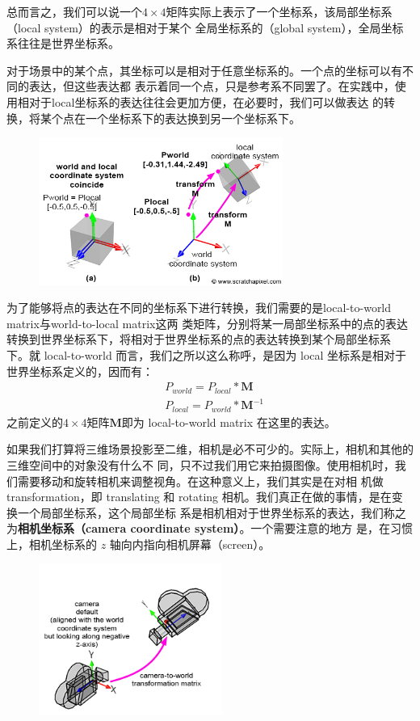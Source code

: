 \documentclass[12pt]{article}
\begin{document}
\indent{}总而言之，我们可以说一个$4\times 4$矩阵实际上表示了一个坐标系，该局部坐标系（local system）的表示是相对于某个
全局坐标系的（global system），全局坐标系往往是世界坐标系。

\indent{}对于场景中的某个点，其坐标可以是相对于任意坐标系的。一个点的坐标可以有不同的表达，但这些表达都
表示着同一个点，只是参考系不同罢了。在实践中，使用相对于local坐标系的表达往往会更加方便，在必要时，我们可以做表达
的转换，将某个点在一个坐标系下的表达换到另一个坐标系下。

\begin{figure}[h]
\centering
\includegraphics[width=8cm]{./imgs/coordsys2.png}
\end{figure}

\indent{}为了能够将点的表达在不同的坐标系下进行转换，我们需要的是local-to-world matrix与world-to-local matrix这两
类矩阵，分别将某一局部坐标系中的点的表达转换到世界坐标系下，将相对于世界坐标系的点的表达转换到某个局部坐标系
下。就 local-to-world 而言，我们之所以这么称呼，是因为 local 坐标系是相对于世界坐标系定义的，因而有：
\begin{align*}
&P_{world} = P_{local} * \mathbf{M}\\
&P_{local} = P_{world} * \mathbf{M}^{-1}
\end{align*}
\noindent{}之前定义的$4\times 4$矩阵$\mathbf{M}$即为 local-to-world matrix 在这里的表达。

\indent{}如果我们打算将三维场景投影至二维，相机是必不可少的。实际上，相机和其他的三维空间中的对象没有什么不
同，只不过我们用它来拍摄图像。使用相机时，我们需要移动和旋转相机来调整视角。在这种意义上，我们其实是在对相
机做transformation，即 translating 和 rotating 相机。我们真正在做的事情，是在变换一个局部坐标系，这个局部坐标
系是相机相对于世界坐标系的表达，我们称之为\textbf{相机坐标系（camera coordinate system）}。一个需要注意的地方
是，在习惯上，相机坐标系的 $z$ 轴向内指向相机屏幕（screen）。

\begin{figure}[h]
\centering
\includegraphics[width=6cm]{./imgs/camera2.png}
\end{figure}
\end{document}
